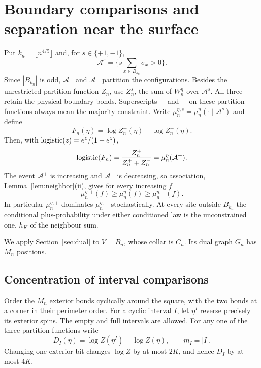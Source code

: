 \section{Boundary comparisons and separation near the surface}\label{sec:contours}
Put $k_n=\lfloor n^{4/5}\rfloor$ and, for $s\in\{+1,-1\}$,
\[
 \mathcal A^s=\Big\{s\sum_{x\in B_{k_n}}\sigma_x>0\Big\}.
\]
Since $|B_{k_n}|$ is odd, $\mathcal A^+$ and $\mathcal A^-$ partition the configurations. Besides the unrestricted partition function $Z_n$, use $Z_n^s$, the sum of $W_n^\eta$ over $\mathcal A^s$. All three retain the physical boundary bonds. Superscripts $+$ and $-$ on these partition functions always mean the majority constraint. Write $\mu_n^{\eta,s}=\mu_n^\eta(\cdot\mid\mathcal A^s)$ and define
\begin{equation}\label{eq:F}
 F_n(\eta)=\log Z_n^+(\eta)-\log Z_n^-(\eta).
\end{equation}
Then, with $\operatorname{logistic}(z)=e^z/(1+e^z)$,
\begin{equation}\label{eq:logistic}
 \operatorname{logistic}(F_n)=\frac{Z_n^+}{Z_n^++Z_n^-}=\mu_n^\eta(\mathcal A^+).
\end{equation}
The event $\mathcal A^+$ is increasing and $\mathcal A^-$ is decreasing, so association, Lemma~\ref{lem:neighbor}(ii), gives for every increasing $f$
\begin{equation}\label{eq:ordered}
 \mu_n^{\eta,+}(f)\ge\mu_n^\eta(f)\ge\mu_n^{\eta,-}(f).
\end{equation}
In particular $\mu_n^{\eta,+}$ dominates $\mu_n^{\eta,-}$ stochastically. At every site outside $B_{k_n}$ the conditional plus-probability under either conditioned law is the unconstrained one, $h_K$ of the neighbour sum.

We apply Section~\ref{sec:dual} to $V=B_n$, whose collar is $C_n$. Its dual graph $G_n$ has $M_n$ positions.

\subsection{Concentration of interval comparisons}
Order the $M_n$ exterior bonds cyclically around the square, with the two bonds at a corner in their perimeter order. For a cyclic interval $I$, let $\eta^I$ reverse precisely its exterior spins. The empty and full intervals are allowed. For any one of the three partition functions write
\[
 D_I(\eta)=\log Z(\eta^I)-\log Z(\eta),\qquad m_I=|I|.
\]
Changing one exterior bit changes $\log Z$ by at most $2K$, and hence $D_I$ by at most $4K$.


